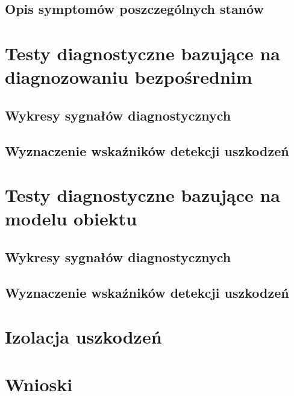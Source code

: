 \documentclass[a4paper,12pt]{article}
\begin{document}
\subsection{Opis symptomów poszczególnych stanów}


\section{Testy diagnostyczne bazujące na diagnozowaniu bezpośrednim}


\subsection{Wykresy sygnałów diagnostycznych}


\subsection{Wyznaczenie wskaźników detekcji uszkodzeń}

\section{Testy diagnostyczne bazujące na modelu obiektu}


\subsection{Wykresy sygnałów diagnostycznych}


\subsection{Wyznaczenie wskaźników detekcji uszkodzeń}


\section{Izolacja uszkodzeń}


\section{Wnioski}
\end{document}
